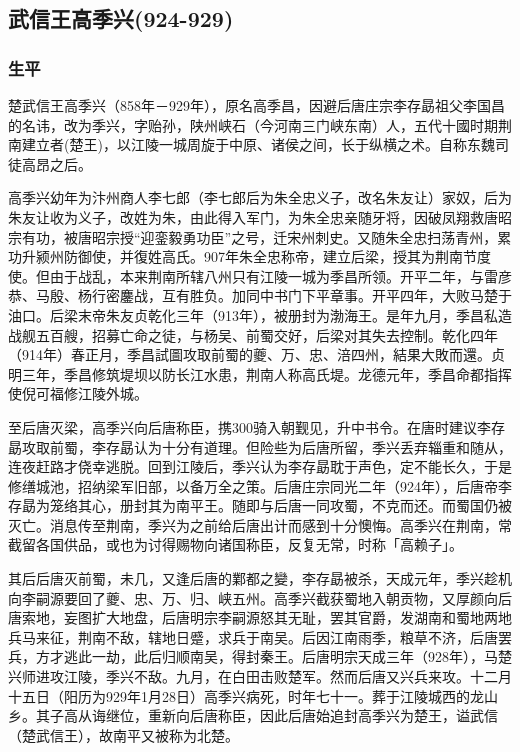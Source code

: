 
\subsection{武信王高季兴\tiny(924-929)}

\subsubsection{生平}

楚武信王高季兴（858年－929年），原名高季昌，因避后唐庄宗李存勗祖父李国昌的名讳，改为季兴，字贻孙，陕州峡石（今河南三门峡东南）人，五代十國时期荆南建立者(楚王)，以江陵一城周旋于中原、诸侯之间，长于纵横之术。自称东魏司徒高昂之后。

高季兴幼年为汴州商人李七郎（李七郎后为朱全忠义子，改名朱友让）家奴，后为朱友让收为义子，改姓为朱，由此得入军门，为朱全忠亲随牙将，因破凤翔救唐昭宗有功，被唐昭宗授“迎銮毅勇功臣”之号，迁宋州刺史。又随朱全忠扫荡青州，累功升颍州防御使，并復姓高氏。907年朱全忠称帝，建立后梁，授其为荆南节度使。但由于战乱，本来荆南所辖八州只有江陵一城为季昌所领。开平二年，与雷彦恭、马殷、杨行密鏖战，互有胜负。加同中书门下平章事。开平四年，大败马楚于油口。后梁末帝朱友贞乾化三年（913年），被册封为渤海王。是年九月，季昌私造战舰五百艘，招募亡命之徒，与杨吴、前蜀交好，后梁对其失去控制。乾化四年（914年）春正月，季昌試圖攻取前蜀的夔、万、忠、涪四州，結果大敗而還。贞明三年，季昌修筑堤坝以防长江水患，荆南人称高氏堤。龙德元年，季昌命都指挥使倪可福修江陵外城。

至后唐灭梁，高季兴向后唐称臣，携300骑入朝觐见，升中书令。在唐时建议李存勗攻取前蜀，李存勗认为十分有道理。但险些为后唐所留，季兴丢弃辎重和随从，连夜赶路才侥幸逃脱。回到江陵后，季兴认为李存勗耽于声色，定不能长久，于是修缮城池，招纳梁军旧部，以备万全之策。后唐庄宗同光二年（924年），后唐帝李存勗为笼络其心，册封其为南平王。随即与后唐一同攻蜀，不克而还。而蜀国仍被灭亡。消息传至荆南，季兴为之前给后唐出计而感到十分懊悔。高季兴在荆南，常截留各国供品，或也为讨得赐物向诸国称臣，反复无常，时称「高赖子」。

其后后唐灭前蜀，未几，又逢后唐的鄴都之變，李存勗被杀，天成元年，季兴趁机向李嗣源要回了夔、忠、万、归、峡五州。高季兴截获蜀地入朝贡物，又厚颜向后唐索地，妄图扩大地盘，后唐明宗李嗣源怒其无耻，罢其官爵，发湖南和蜀地两地兵马来征，荆南不敌，辖地日蹙，求兵于南吴。后因江南雨季，粮草不济，后唐罢兵，方才逃此一劫，此后归顺南吴，得封秦王。后唐明宗天成三年（928年），马楚兴师进攻江陵，季兴不敌。九月，在白田击败楚军。然而后唐又兴兵来攻。十二月十五日（阳历为929年1月28日）高季兴病死，时年七十一。葬于江陵城西的龙山乡。其子高从诲继位，重新向后唐称臣，因此后唐始追封高季兴为楚王，谥武信（楚武信王），故南平又被称为北楚。

